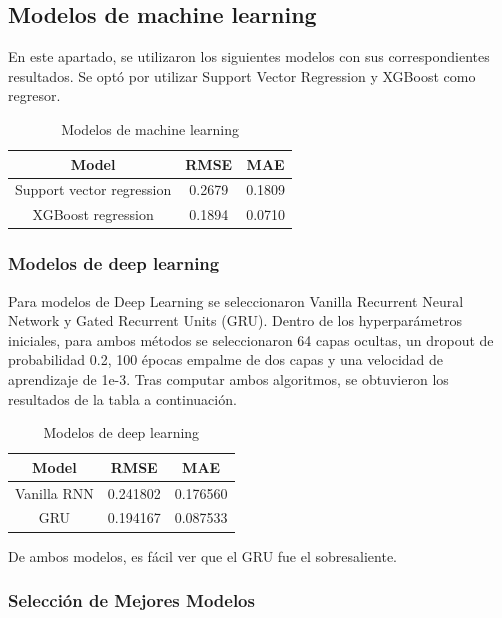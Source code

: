 \documentclass{article}
\begin{document}
\subsection{Modelos de machine learning}
En este apartado, se utilizaron los siguientes modelos con sus correspondientes resultados.
Se optó por utilizar Support Vector Regression y XGBoost como regresor. 
\begin{table}[ht]
\caption{Modelos de machine learning} 
\centering 
\begin{tabular}{c c c} 
\hline\hline 
        Model & RMSE & MAE \\ [0.5ex] 
\hline 
        Support vector regression & 0.2679 & 0.1809 \\ 
        XGBoost regression & 0.1894 & 0.0710 \\ [1ex] 
\hline 
\end{tabular}
\end{table}

\subsubsection{Modelos de deep learning}

Para modelos de Deep Learning se seleccionaron Vanilla Recurrent Neural Network y Gated Recurrent Units (GRU). Dentro de los hyperparámetros iniciales, para ambos métodos se seleccionaron 64 capas ocultas, un dropout de probabilidad 0.2, 100 épocas empalme de dos capas y una velocidad de aprendizaje de 1e-3.
Tras computar ambos algoritmos, se obtuvieron los resultados de la tabla a continuación.

\begin{table}[ht]
    \caption{Modelos de deep learning} 
    \centering 
    \begin{tabular}{c c c} 
        \hline\hline 
        Model & RMSE & MAE \\ [0.5ex] 
        \hline 
        Vanilla RNN & 0.241802  & 0.176560 \\ 
        GRU & 0.194167 &  0.087533\\ [1ex] 
        \hline 
    \end{tabular}
\end{table}

De ambos modelos, es fácil ver que el GRU fue el sobresaliente.

\subsubsection{Selección de Mejores Modelos}
\end{document}
